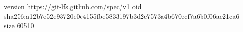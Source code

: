 version https://git-lfs.github.com/spec/v1
oid sha256:a12b7e52e93720e0e4155fbe5833197b3d2c7573a4b670ecf7a6b0f06ae21ca6
size 60510

